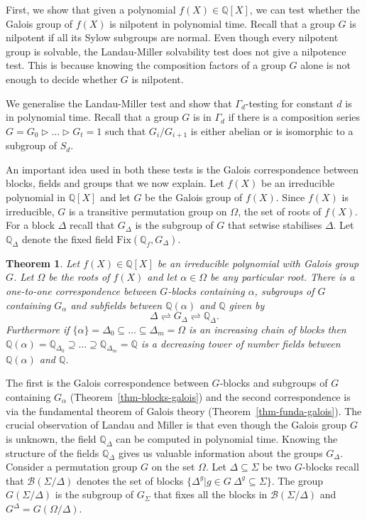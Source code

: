 \documentclass[11pt]{madras}%
\newtheorem{theorem}{Theorem}[chapter]
\theoremstyle{remark}
\newcommand{\Blocks}[1]{{\ensuremath{\mathcal{B}\left(#1\right)}}}
\newcommand{\Gof}[2][G]{{\ensuremath{#1\left(#2\right)}}}
\newcommand{\Fix}[2]{{\ensuremath{\mathrm{Fix}\left(#1,#2\right)}}}
\begin{document}
First, we show that given a polynomial $f(X) \in \mathbb{Q}[X]$, we
can test whether the Galois group of $f(X)$ is nilpotent in polynomial
time. Recall that a group $G$ is nilpotent if all its Sylow subgroups
are normal. Even though every nilpotent group is solvable, the
Landau-Miller solvability test does not give a nilpotence test.  This
is because knowing the composition factors of a group $G$ alone is not
enough to decide whether $G$ is nilpotent.

We generalise the Landau-Miller test and show that $\Gamma_d$-testing
for constant $d$ is in polynomial time.  Recall that a group $G$ is in
$\Gamma_d$ if there is a composition series $G = G_0 \rhd \ldots \rhd
G_t = 1$ such that $G_i/G_{i+1}$ is either abelian or is isomorphic to
a subgroup of $S_d$. 

An important idea used in both these tests is the Galois
correspondence between blocks, fields and groups that we now explain.
Let $f(X)$ be an irreducible polynomial in $\mathbb{Q}[X]$ and let $G$
be the Galois group of $f(X)$. Since $f(X)$ is irreducible, $G$ is a
transitive permutation group on $\Omega$, the set of roots of $f(X)$.
For a block $\Delta$ recall that $G_\Delta$ is the subgroup of $G$
that setwise stabilises $\Delta$. Let $\mathbb{Q}_\Delta$ denote the
fixed field $\Fix{\mathbb{Q}_f}{G_\Delta}$.

\begin{theorem}\label{thm-twoway-galois}
  Let $f(X) \in \mathbb{Q}[X]$ be an irreducible polynomial with
  Galois group $G$. Let $\Omega$ be the roots of $f(X)$ and let
  $\alpha \in \Omega$ be any particular root.  There is a one-to-one
  correspondence between $G$-blocks containing $\alpha$, subgroups of
  $G$ containing $G_\alpha$ and subfields between $\mathbb{Q}(\alpha)$
  and $\mathbb{Q}$ given by
  \[ 
  \Delta \rightleftharpoons G_\Delta \rightleftharpoons
  \mathbb{Q}_\Delta.
  \]
  Furthermore if $\{ \alpha \} = \Delta_0 \subseteq \ldots \subseteq
  \Delta_m = \Omega$ is an increasing chain of blocks then
  $\mathbb{Q}(\alpha) = \mathbb{Q}_{\Delta_0} \supseteq \ldots
  \supseteq \mathbb{Q}_{\Delta_m} = \mathbb{Q}$ is a decreasing tower
  of number fields between $\mathbb{Q}(\alpha)$ and $\mathbb{Q}$.
\end{theorem}

The first is the Galois correspondence between $G$-blocks and
subgroups of $G$ containing $G_\alpha$
(Theorem~\ref{thm-blocks-galois}) and the second correspondence is via
the fundamental theorem of Galois theory
(Theorem~\ref{thm-funda-galois}).  The crucial observation of Landau
and Miller is that even though the Galois group $G$ is unknown, the
field $\mathbb{Q}_\Delta$ can be computed in polynomial time.  Knowing
the structure of the fields $\mathbb{Q}_\Delta$ gives us valuable
information about the groups $G_\Delta$. Consider a permutation group
$G$ on the set $\Omega$. Let $\Delta \subseteq \Sigma$ be two
$G$-blocks recall that $\Blocks{\Sigma/\Delta}$ denotes the set of
blocks $\{ \Delta^g | g \in G\ \Delta^g \subseteq \Sigma \}$. The group
$\Gof{\Sigma/\Delta}$ is the subgroup of $G_\Sigma$ that fixes all the
blocks in $\Blocks{\Sigma/\Delta}$ and $G^\Delta =
\Gof{\Omega/\Delta}$.
\end{document}
